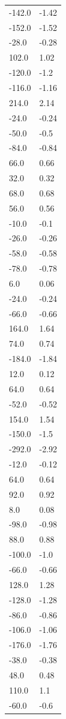 \begin{longtable}{ll}
-142.0 & -1.42 \\
-152.0 & -1.52 \\
-28.0 & -0.28 \\
102.0 & 1.02 \\
-120.0 & -1.2 \\
-116.0 & -1.16 \\
214.0 & 2.14 \\
-24.0 & -0.24 \\
-50.0 & -0.5 \\
-84.0 & -0.84 \\
66.0 & 0.66 \\
32.0 & 0.32 \\
68.0 & 0.68 \\
56.0 & 0.56 \\
-10.0 & -0.1 \\
-26.0 & -0.26 \\
-58.0 & -0.58 \\
-78.0 & -0.78 \\
6.0 & 0.06 \\
-24.0 & -0.24 \\
-66.0 & -0.66 \\
164.0 & 1.64 \\
74.0 & 0.74 \\
-184.0 & -1.84 \\
12.0 & 0.12 \\
64.0 & 0.64 \\
-52.0 & -0.52 \\
154.0 & 1.54 \\
-150.0 & -1.5 \\
-292.0 & -2.92 \\
-12.0 & -0.12 \\
64.0 & 0.64 \\
92.0 & 0.92 \\
8.0 & 0.08 \\
-98.0 & -0.98 \\
88.0 & 0.88 \\
-100.0 & -1.0 \\
-66.0 & -0.66 \\
128.0 & 1.28 \\
-128.0 & -1.28 \\
-86.0 & -0.86 \\
-106.0 & -1.06 \\
-176.0 & -1.76 \\
-38.0 & -0.38 \\
48.0 & 0.48 \\
110.0 & 1.1 \\
-60.0 & -0.6 \\

\end{longtable}
